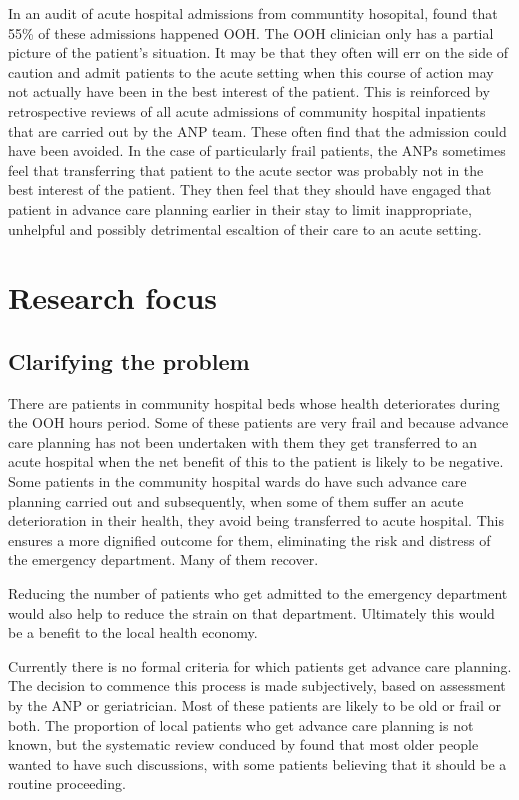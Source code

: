\documentclass
[
	12pt,
	a4paper,
	oneside,
]{report}
\begin{document}
In an audit of acute hospital admissions from communtity hosopital,
\textcite{endacott:15} found that 55\% of these admissions happened OOH. 
The OOH clinician only has a partial picture of the patient's situation. It may 
be that they often will err on the side of caution and
admit patients to the acute setting when this course of action may not actually have
been in the best interest of the patient. This is reinforced by retrospective reviews
of all acute admissions of community hospital inpatients that are carried out by the 
ANP team. These often find that the admission could have been avoided. In the case
of particularly frail patients, the ANPs sometimes feel that transferring that
patient to the acute sector was probably not in the best interest of the patient. 
They then feel that they should have engaged that patient in advance care planning
earlier in their stay to limit inappropriate, unhelpful and possibly detrimental 
escaltion of their care to an acute setting.

\section{Research focus}

\subsection{Clarifying the problem}

There are patients in community hospital beds whose health deteriorates during
the OOH hours period. Some of these patients are very frail and because advance
care planning has not been undertaken with them they get transferred to an acute 
hospital when the net benefit of this to the patient is likely to be negative.
Some patients in the community hospital wards do have such advance care planning 
carried out and subsequently, when some of them suffer an acute deterioration in
their health, they avoid being transferred to acute hospital. This ensures a more
dignified outcome for them, eliminating the risk and distress of the emergency
department. Many of them recover.

Reducing the number of patients who get admitted to the emergency department would
also help to reduce the strain on that department. Ultimately this would be a
benefit to the local health economy.

Currently there is no formal criteria for which patients get advance care planning.
The decision to commence this process is made subjectively, based on assessment 
by the ANP or geriatrician. Most of these patients are likely to be old or frail
or both. The proportion of local patients who get advance care planning is not known,
but the systematic review conduced by \textcite{sharp:13} found that most older
people wanted to have such discussions, with some patients believing that it 
should be a routine proceeding.
\end{document}
